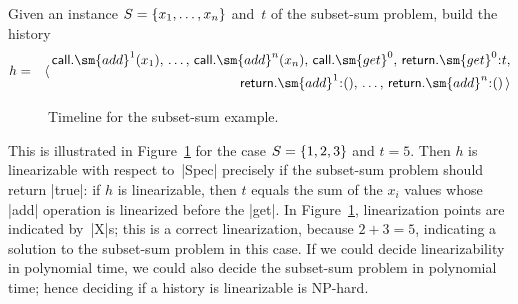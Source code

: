Given an instance $S = \{x_1,\ldots,x_n\}$ and~$t$ of the subset-sum
problem, build the history
\begin{eqnarray*}
h & = & \langle\,
  \begin{align}
  \call.\sm{add}^1(x_1),\, \ldots,\, \call.\sm{add}^n(x_n),\, 
  \call.\sm{get}^0,\,  \return.\sm{get}^0\::t, \\
  \return.\sm{add}^1\::(),\, \ldots,\, 
     \return.\sm{add}^n\::() \, \rangle
  \end{align}
\end{eqnarray*}
%
\begin{figure}[hbt]
\def\X{node{\scalastyle X};}
\begin{center}
\end{center}
\caption{Timeline for the subset-sum example.}
\label{fig:subset-sum}
\end{figure}%
%
This is illustrated in Figure~\ref{fig:subset-sum} for the case $S =
\{1,2,3\}$ and $t = 5$.
%
Then $h$ is linearizable with respect to~|Spec| precisely if the subset-sum
problem should return |true|: if $h$ is linearizable, then $t$ equals the sum
of the $x_i$ values whose |add| operation is linearized before the |get|.  In
Figure~\ref{fig:subset-sum}, linearization points are indicated by~|X|s; this
is a correct linearization, because $2+3 = 5$, indicating a solution to the
subset-sum problem in this case.  If we could decide linearizability in
polynomial time, we could also decide the subset-sum problem in polynomial
time; hence deciding if a history is linearizable is NP-hard.
